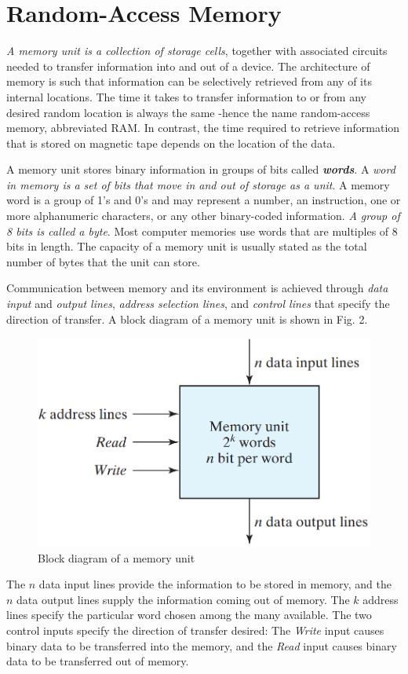 \section{Random-Access Memory}
\label{sec:ram}

\textit{A memory unit is a collection of storage cells}, together with associated circuits needed to transfer information into and out of a device. The architecture of memory is such that information can be selectively retrieved from any of its internal locations. The time it takes to transfer information to or from any desired random location is always the same -hence the name random-access memory, abbreviated RAM. In contrast, the time required to retrieve information that is stored on magnetic tape depends on the location of the data.

A memory unit stores binary information in groups of bits called \textbf{\textit{words}}. A \textit{word in memory is a set of bits that move in and out of storage as a unit}. A memory word is a group of 1's and 0's and may represent a number, an instruction, one or more alphanumeric characters, or any other binary-coded information. \textit{A group of 8 bits is called a byte}. Most computer memories use words that are multiples of 8 bits in length. The capacity of a memory unit is usually stated as the total number of bytes that the unit can store.

Communication between memory and its environment is achieved through \textit{data input} and \textit{output lines}, \textit{address selection lines}, and \textit{control lines} that specify the direction of transfer. A block diagram of a memory unit is shown in Fig. 2. 
\begin{figure}[H]
  \centering
  \includegraphics[width=\linewidth]{img/fig-7.2.png}
  \caption{Block diagram of a memory unit}
  \label{fig:7.2}
\end{figure}
\noindent The $n$ data input lines provide the information to be stored in memory, and the $n$ data output lines supply the information coming out of memory. The $k$ address lines specify the particular word chosen among the many available. The two control inputs specify the direction of transfer 
desired: The \textit{Write} input causes binary data to be transferred into the memory, and the \textit{Read} input causes binary data to be transferred out of memory.

